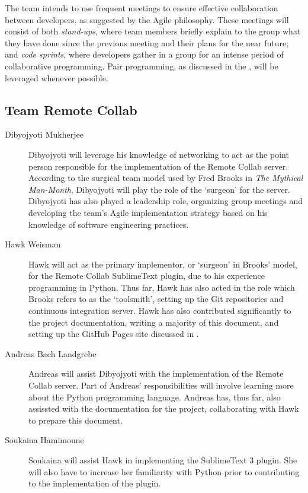 \documentclass[11pt,english]{article}
\begin{document}
		The team intends to use frequent meetings to ensure effective collaboration between developers, as suggested by the Agile philosophy. These meetings will consist of both \textit{stand-ups}, where team members briefly explain to the group what they have done since the previous meeting and their plans for the near future; and \textit{code sprints}, where developers gather in a group for an intense period of collaborative programming. Pair programming, as discussed in the , will be leveraged whenever possible.

	\subsection{Team Remote Collab}
		\begin{description}
			\item[Dibyojyoti Mukherjee]{Dibyojyoti will leverage his knowledge of networking to act as the point person responsible for the implementation of the Remote Collab server. According to the surgical team model used by Fred Brooks in \textit{The Mythical Man-Month}\cite{mythical}, Dibyojyoti will play the role of the `surgeon' for the server. Dibyojyoti has also played a leadership role, organizing group meetings and developing the team's Agile implementation strategy based on his knowledge of software engineering practices.}
			\item[Hawk Weisman]{Hawk will act as the primary implementor, or `surgeon' in Brooks' model\cite{mythical}, for the Remote Collab SublimeText plugin, due to his experience programming in Python. Thus far, Hawk has also acted in the role which Brooks refers to as the `toolsmith'\cite{mythical}, setting up the Git repositories and continuous integration server. Hawk has also contributed significantly to the project documentation, writing a majority of this document, and setting up the GitHub Pages site discussed in .}
			\item[Andreas Bach Landgrebe]{Andreas will assist Dibyojyoti with the implementation of the Remote Collab server. Part of Andreas' responsibilities will involve learning more about the Python programming language. Andreas has, thus far, also assissted with the documentation for the project, collaborating with Hawk to prepare this document.}
			\item[Soukaina Hamimoune]{Soukaina will assist Hawk in implementing the SublimeText 3 plugin. She will also have to increase her familiarity with Python prior to contributing to the implementation of the plugin.}
		\end{description}
\end{document}
